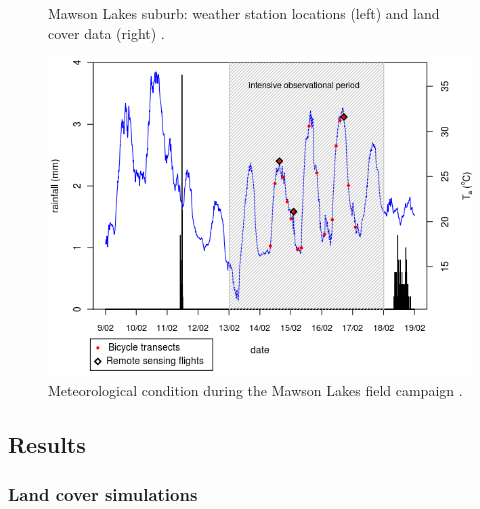 \documentclass[final,3p,times,authoryear]{elsarticle}
\begin{document}
\begin{figure}[!htbp]
 \caption{Mawson Lakes suburb: weather station locations (left) and land cover data (right) \citep{Broadbent2016}.} \label{fig:mawson}
\end{figure}


\begin{figure}[!htbp]
\includegraphics[trim=0mm 0mm 0mm 0mm, clip,scale=1.0]{images/met3.png}
 \caption{Meteorological condition during the Mawson Lakes field campaign \citep{Broadbent2016}.} \label{fig:met3}
\end{figure}


\subsection{Results}\label{sec:Results} 
\subsubsection{Land cover simulations}\label{sec:landcoverresult} 
\end{document}
